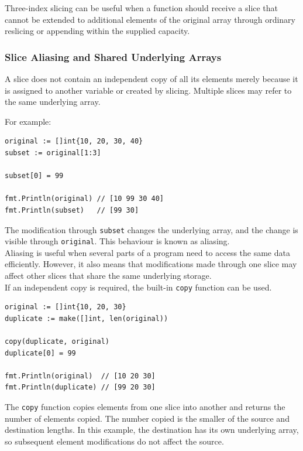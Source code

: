 Three-index slicing can be useful when a function should receive a slice that cannot be extended to additional elements of the original array through ordinary reslicing or appending within the supplied capacity.

\subsubsection{Slice Aliasing and Shared Underlying Arrays}

A slice does not contain an independent copy of all its elements merely because it is assigned to another variable or created by slicing. Multiple slices may refer to the same underlying array.

For example:

\begin{lstlisting}
original := []int{10, 20, 30, 40}
subset := original[1:3]

subset[0] = 99

fmt.Println(original) // [10 99 30 40]
fmt.Println(subset)   // [99 30]
\end{lstlisting}

The modification through \texttt{subset} changes the underlying array, and the change is visible through \texttt{original}. This behaviour is known as aliasing.\\

Aliasing is useful when several parts of a program need to access the same data efficiently. However, it also means that modifications made through one slice may affect other slices that share the same underlying storage.\\

If an independent copy is required, the built-in \texttt{copy} function can be used.

\begin{lstlisting}
original := []int{10, 20, 30}
duplicate := make([]int, len(original))

copy(duplicate, original)
duplicate[0] = 99

fmt.Println(original)  // [10 20 30]
fmt.Println(duplicate) // [99 20 30]
\end{lstlisting}

The \texttt{copy} function copies elements from one slice into another and returns the number of elements copied. The number copied is the smaller of the source and destination lengths. In this example, the destination has its own underlying array, so subsequent element modifications do not affect the source.

